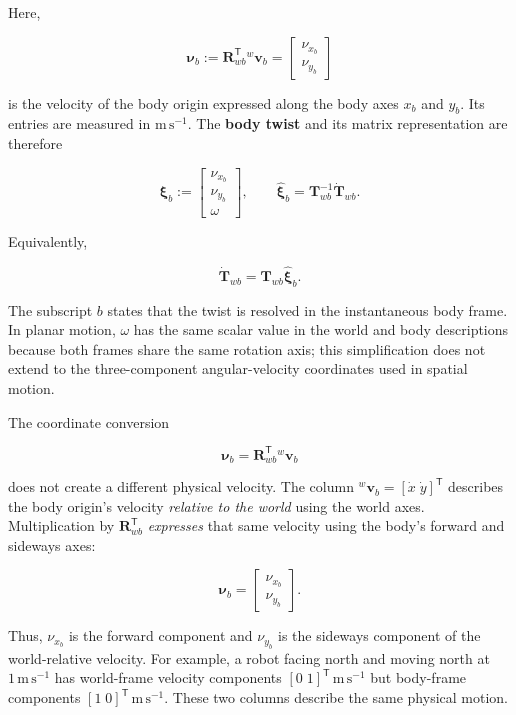 \documentclass[
  australian,
  12pt,
  letterpaper,
  DIV=11,
  numbers=noendperiod,
  twoside]{scrreprt}
\begin{document}
Here,

\[
\boldsymbol\nu_b
\mathrel{:=}
\mathbf R_{wb}^\mathsf T{}^w\mathbf v_b
=
\begin{bmatrix}
\nu_{x_b}\\
\nu_{y_b}
\end{bmatrix}
\]

is the velocity of the body origin expressed along the body axes \(x_b\)
and \(y_b\). Its entries are measured in \(\mathrm{m\,s^{-1}}\). The
\textbf{body twist} and its matrix representation are therefore

\[
\boxed{
\boldsymbol\xi_b
\mathrel{:=}
\begin{bmatrix}
\nu_{x_b}\\
\nu_{y_b}\\
\omega
\end{bmatrix},
\qquad
\widehat{\boldsymbol\xi}_b
=
\mathbf T_{wb}^{-1}\dot{\mathbf T}_{wb}
}.
\]

Equivalently,

\[
\boxed{
\dot{\mathbf T}_{wb}
=
\mathbf T_{wb}\widehat{\boldsymbol\xi}_b
}.
\]

The subscript \(b\) states that the twist is resolved in the
instantaneous body frame. In planar motion, \(\omega\) has the same
scalar value in the world and body descriptions because both frames
share the same rotation axis; this simplification does not extend to the
three-component angular-velocity coordinates used in spatial motion.

The coordinate conversion

\[
\boldsymbol\nu_b
=
\mathbf R_{wb}^{\mathsf T}{}^w\mathbf v_b
\]

does not create a different physical velocity. The column
\({}^w\mathbf v_b=[\dot x\;\dot y]^\mathsf T\) describes the body
origin's velocity \emph{relative to the world} using the world axes.
Multiplication by \(\mathbf R_{wb}^{\mathsf T}\) \emph{expresses} that
same velocity using the body's forward and sideways axes:

\[
\boldsymbol\nu_b
=
\begin{bmatrix}
\nu_{x_b}\\
\nu_{y_b}
\end{bmatrix}.
\]

Thus, \(\nu_{x_b}\) is the forward component and \(\nu_{y_b}\) is the
sideways component of the world-relative velocity. For example, a robot
facing north and moving north at \(1\,\mathrm{m\,s^{-1}}\) has
world-frame velocity components \([0\;1]^\mathsf T\,\mathrm{m\,s^{-1}}\)
but body-frame components \([1\;0]^\mathsf T\,\mathrm{m\,s^{-1}}\).
These two columns describe the same physical motion.
\end{document}
